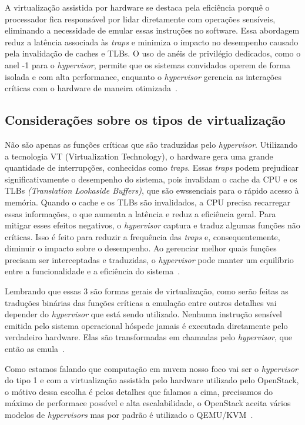 A virtualização assistida por hardware se destaca pela eficiência porquê o processador fica responsável por lidar diretamente com operações sensíveis, eliminando a necessidade de emular essas instruções no software. Essa abordagem reduz a latência associada às \textit{traps} e minimiza o impacto no desempenho causado pela invalidação de caches e TLBs. O uso de anéis de privilégio dedicados, como o anel -1 para o \textit{hypervisor}, permite que os sistemas convidados operem de forma isolada e com alta performance, enquanto o \textit{hypervisor} gerencia as interações críticas com o hardware de maneira otimizada~\citep{chirammal2016mastering}.

\subsection{Considerações sobre os tipos de virtualização}

Não são apenas as funções críticas que são traduzidas pelo \textit{hypervisor}. Utilizando a tecnologia VT (Virtualization Technology), o hardware gera uma grande quantidade de interrupções, conhecidas como \textit{traps}. Essas \textit{traps} podem prejudicar significativamente o desempenho do sistema, pois invalidam o cache da CPU e os TLBs \textit{(Translation Lookaside Buffers)}, que são ewssenciais para o rápido acesso à memória. Quando o cache e os TLBs são invalidados, a CPU precisa recarregar essas informações, o que aumenta a latência e reduz a eficiência geral. Para mitigar esses efeitos negativos, o \textit{hypervisor} captura e traduz algumas funções não críticas. Isso é feito para reduzir a frequência das \textit{traps} e, consequentemente, diminuir o impacto sobre o desempenho. Ao gerenciar melhor quais funções precisam ser interceptadas e traduzidas, o \textit{hypervisor} pode manter um equilíbrio entre a funcionalidade e a eficiência do sistema~\citep{modernOS}.

Lembrando que essas 3 são formas gerais de virtualização, como serão feitas as traduções binárias das funções críticas a emulação entre outros detalhes vai depender do \textit{hypervisor} que está sendo utilizado. Nenhuma instrução sensível emitida pelo sistema operacional hóspede jamais é executada diretamente pelo verdadeiro hardware. Elas são transformadas em chamadas pelo \textit{hypervisor}, que então as emula~\citep{modernOS}.

Como estamos falando que computação em nuvem nosso foco vai ser o \textit{hypervisor} do tipo 1 e com a virtualização assistida pelo hardware utilizado pelo OpenStack, o mótivo dessa escolha é pelos detalhes que falamos a cima, precisamos do máximo de performace possível e alta escalabilidade, o OpenStack aceita vários modelos de \textit{hypervisors} mas por padrão é utilizado o QEMU/KVM~\citep{DocumentacaoOpenstack}.


